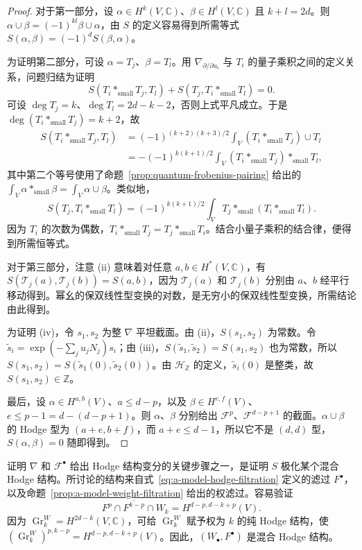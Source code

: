 \begin{proof}
对于第一部分，设 $\alpha\in H^k(V,\mathbb C)$、$\beta\in H^l(V,\mathbb C)$ 且 $k+l=2d$。则 $\alpha\cup\beta=(-1)^{kl}\beta\cup\alpha$，由 $S$ 的定义容易得到所需等式 $S(\alpha,\beta)=(-1)^dS(\beta,\alpha)$。

为证明第二部分，可设 $\alpha=T_j$、$\beta=T_l$。用 $\nabla_{\partial/\partial u_i}$ 与 $T_i$ 的量子乘积之间的定义关系，问题归结为证明
\[
S(T_i*_{\mathrm{small}}T_j,T_l)+S(T_j,T_i*_{\mathrm{small}}T_l)=0.
\]
可设 $\deg T_j=k$、$\deg T_l=2d-k-2$，否则上式平凡成立。于是 $\deg(T_i*_{\mathrm{small}}T_j)=k+2$，故
\[
\begin{aligned}
S(T_i*_{\mathrm{small}}T_j,T_l)
&=(-1)^{(k+2)(k+3)/2}\int_V(T_i*_{\mathrm{small}}T_j)\cup T_l\\
&=-(-1)^{k(k+1)/2}\int_V(T_i*_{\mathrm{small}}T_j)*_{\mathrm{small}}T_l,
\end{aligned}
\]
其中第二个等号使用了命题~\ref{prop:quantum-frobenius-pairing} 给出的 $\int_V\alpha*_{\mathrm{small}}\beta=\int_V\alpha\cup\beta$。类似地，
\[
S(T_j,T_i*_{\mathrm{small}}T_l)=(-1)^{k(k+1)/2}\int_VT_j*_{\mathrm{small}}(T_i*_{\mathrm{small}}T_l).
\]
因为 $T_i$ 的次数为偶数，$T_i*_{\mathrm{small}}T_j=T_j*_{\mathrm{small}}T_i$。结合小量子乘积的结合律，便得到所需恒等式。

对于第三部分，注意 (ii) 意味着对任意 $a,b\in H^*(V,\mathbb C)$，有 $S(\mathcal T_j(a),\mathcal T_j(b))=S(a,b)$，因为 $\mathcal T_j(a)$ 和 $\mathcal T_j(b)$ 分别由 $a$、$b$ 经平行移动得到。幂幺的保双线性型变换的对数，是无穷小的保双线性型变换，所需结论由此得到。

为证明 (iv)，令 $s_1,s_2$ 为整 $\nabla$ 平坦截面。由 (ii)，$S(s_1,s_2)$ 为常数。令 $\widetilde s_i=\exp(-\sum_ju_jN_j)s_i$；由 (iii)，$S(\widetilde s_1,\widetilde s_2)=S(s_1,s_2)$ 也为常数，所以 $S(s_1,s_2)=S(\widetilde s_1(0),\widetilde s_2(0))$。由 $\mathcal H_{\mathbb Z}$ 的定义，$\widetilde s_i(0)$ 是整类，故 $S(s_1,s_2)\in\mathbb Z$。

最后，设 $\alpha\in H^{a,b}(V)$、$a\le d-p$，以及 $\beta\in H^{e,f}(V)$、$e\le p-1=d-(d-p+1)$。则 $\alpha$、$\beta$ 分别给出 $\mathcal F^p$、$\mathcal F^{d-p+1}$ 的截面。$\alpha\cup\beta$ 的 Hodge 型为 $(a+e,b+f)$，而 $a+e\le d-1$，所以它不是 $(d,d)$ 型，$S(\alpha,\beta)=0$ 随即得到。
\end{proof}
证明 $\nabla$ 和 $\mathcal F^\bullet$ 给出 Hodge 结构变分的关键步骤之一，是证明 $S$ 极化某个混合 Hodge 结构。所讨论的结构来自式~\eqref{eq:a-model-hodge-filtration} 定义的滤过 $F^\bullet$，以及命题~\ref{prop:a-model-weight-filtration} 给出的权滤过。容易验证
\begin{equation}\label{eq:a-model-mixed-hodge-pieces}
F^p\cap\overline{F^{k-p}}\cap W_k=H^{d-p,d-k+p}(V).
\end{equation}
因为 $\operatorname{Gr}^W_k=H^{2d-k}(V,\mathbb C)$，可给 $\operatorname{Gr}^W_k$ 赋予权为 $k$ 的纯 Hodge 结构，使 $(\operatorname{Gr}^W_k)^{p,k-p}=H^{d-p,d-k+p}(V)$。因此，$(W_\bullet,F^\bullet)$ 是混合 Hodge 结构。

